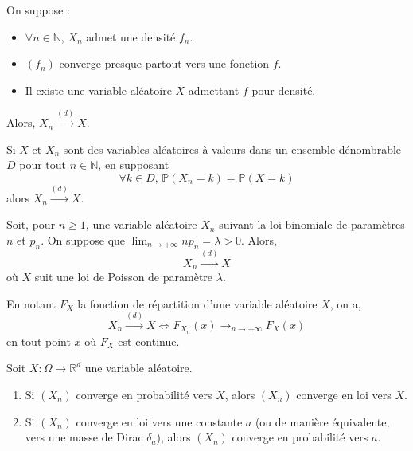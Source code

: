 	\begin{corollary}
		On suppose :
		\begin{itemize}
			\item $\forall n \in \mathbb{N}$, $X_n$ admet une densité $f_n$.
			\item $(f_n)$ converge presque partout vers une fonction $f$.
			\item Il existe une variable aléatoire $X$ admettant $f$ pour densité.
		\end{itemize}
		Alors, $X_n \overset{(d)}{\longrightarrow} X$.
	\end{corollary}

	\begin{corollary}
		Si $X$ et $X_n$ sont des variables aléatoires à valeurs dans un ensemble dénombrable $D$ pour tout $n \in \mathbb{N}$, en supposant
		\[ \forall k \in D, \, \mathbb{P}(X_n = k) = \mathbb{P}(X = k) \]
		alors $X_n \overset{(d)}{\longrightarrow} X$.
	\end{corollary}

	\begin{application}
		Soit, pour $n \geq 1$, une variable aléatoire $X_n$ suivant la loi binomiale de paramètres $n$ et $p_n$. On suppose que $\lim_{n \rightarrow +\infty} n p_n = \lambda > 0$.
		Alors,
		\[ X_n \overset{(d)}{\longrightarrow} X \]
		où $X$ suit une loi de Poisson de paramètre $\lambda$.
	\end{application}


	\begin{theorem}
		En notant $F_X$ la fonction de répartition d'une variable aléatoire $X$, on a,
		\[ X_n \overset{(d)}{\longrightarrow} X \iff F_{X_n}(x) \longrightarrow_{n \rightarrow +\infty} F_X(x) \]
		en tout point $x$ où $F_X$ est continue.
	\end{theorem}

	\begin{theorem}
		Soit $X : \Omega \rightarrow \mathbb{R}^d$ une variable aléatoire.
		\begin{enumerate}[label=(\roman*)]
			\item Si $(X_n)$ converge en probabilité vers $X$, alors $(X_n)$ converge en loi vers $X$.
			\item Si $(X_n)$ converge en loi vers une constante $a$ (ou de manière équivalente, vers une masse de Dirac $\delta_a$), alors $(X_n)$ converge en probabilité vers $a$.
		\end{enumerate}
	\end{theorem}

